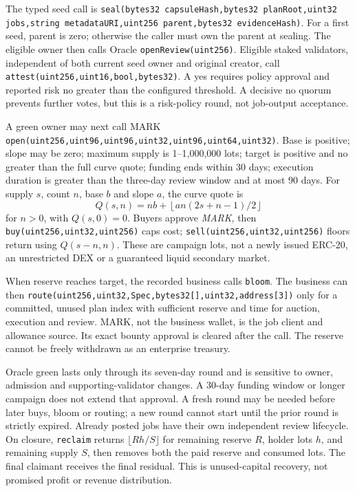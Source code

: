 \documentclass[11pt,letterpaper]{article}
\begin{document}
The typed seed call is \texttt{seal(\allowbreak{}bytes32 capsuleHash,\allowbreak{}bytes32 planRoot,\allowbreak{}uint32 jobs,\allowbreak{}string metadataURI,\allowbreak{}uint256 parent,\allowbreak{}bytes32 evidenceHash)}. For a first seed, parent is zero; otherwise the caller must own the parent at sealing. The eligible owner then calls Oracle \texttt{openReview(\allowbreak{}uint256)}. Eligible staked validators, independent of both current seed owner and original creator, call \texttt{attest(\allowbreak{}uint256,\allowbreak{}uint16,\allowbreak{}bool,\allowbreak{}bytes32)}. A yes requires policy approval and reported risk no greater than the configured threshold. A decisive no quorum prevents further votes, but this is a risk-policy round, not job-output acceptance.

A green owner may next call MARK \texttt{open(\allowbreak{}uint256,\allowbreak{}uint96,\allowbreak{}uint96,\allowbreak{}uint32,\allowbreak{}uint96,\allowbreak{}uint64,\allowbreak{}uint32)}. Base is positive; slope may be zero; maximum supply is 1--1,000,000 lots; target is positive and no greater than the full curve quote; funding ends within 30 days; execution duration is greater than the three-day review window and at most 90 days. For supply \(s\), count \(n\), base \(b\) and slope \(a\), the curve quote is
\[
Q(s,n)=nb+\left\lfloor an(2s+n-1)/2\right\rfloor
\]
for \(n>0\), with \(Q(s,0)=0\). Buyers approve \emph{MARK}, then \texttt{buy(\allowbreak{}uint256,\allowbreak{}uint32,\allowbreak{}uint256)} caps cost; \texttt{sell(\allowbreak{}uint256,\allowbreak{}uint32,\allowbreak{}uint256)} floors return using \(Q(s-n,n)\). These are campaign lots, not a newly issued ERC-20, an unrestricted DEX or a guaranteed liquid secondary market.

When reserve reaches target, the recorded business calls \texttt{bloom}. The business can then \texttt{route(\allowbreak{}uint256,\allowbreak{}uint32,\allowbreak{}Spec,\allowbreak{}bytes32[\allowbreak{}],\allowbreak{}uint32,\allowbreak{}address[\allowbreak{}3])} only for a committed, unused plan index with sufficient reserve and time for auction, execution and review. MARK, not the business wallet, is the job client and allowance source. Its exact bounty approval is cleared after the call. The reserve cannot be freely withdrawn as an enterprise treasury.

Oracle green lasts only through its seven-day round and is sensitive to owner, admission and supporting-validator changes. A 30-day funding window or longer campaign does not extend that approval. A fresh round may be needed before later buys, bloom or routing; a new round cannot start until the prior round is strictly expired. Already posted jobs have their own independent review lifecycle. On closure, \texttt{reclaim} returns \(\lfloor R h/S\rfloor\) for remaining reserve \(R\), holder lots \(h\), and remaining supply \(S\), then removes both the paid reserve and consumed lots. The final claimant receives the final residual. This is unused-capital recovery, not promised profit or revenue distribution.
\end{document}
